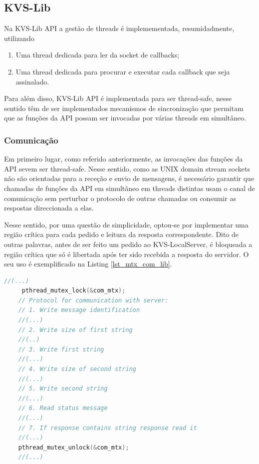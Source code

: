 \subsection{KVS-Lib}
Na KVS-Lib API a gestão de threads é implemementada, resumidadmente, utilizando
\begin{enumerate}[noitemsep]
    \item Uma thread dedicada para ler da socket de callbacks;
    \item Uma thread dedicada para procurar e executar cada callback que seja assinalado.
\end{enumerate}
Para além disso, KVS-Lib API é implementada para ser thread-safe, nesse sentido têm de ser implementados mecanismos de sincronização que permitam que as funções da API possam ser invocadas por várias threads em simultâneo.

\subsubsection{Comunicação}
Em primeiro lugar, como referido anteriormente, as invocações das funções da API sevem ser thread-safe. Nesse sentido, como as UNIX domain stream sockets não são orientadas para a receção e envio de mensagens, é necessário garantir que chamadas de funções da API em simultâneo em threads distintas usam o canal de comunicação sem perturbar o protocolo de outras chamadas ou consumir as respostas direccionada a elas.

Nesse sentido, por uma questão de simplicidade, optou-se por implementar uma região crítica para cada pedido e leitura da resposta correspondente. Dito de outras palavras, antes de ser feito um pedido ao KVS-LocalServer, é bloqueada a região crítica que só é libertada após ter sido recebida a resposta do servidor. O seu uso é exemplificado na Listing \ref{lst_mtx_com_lib}.
\begin{lstlisting}[language=C,label={lst_mtx_com_lib},caption= Uso de uma região crítica para a integridade de comunicação entre KVS-Lib e KVS-LocalServer (\texttt{KVS-lib-com.c}).]
    //(...)
     pthread_mutex_lock(&com_mtx);
    // Protocol for communication with server:
    // 1. Write message identification
    //(...)
    // 2. Write size of first string
    //(..)
    // 3. Write first string
    //(...)
    // 4. Write size of second string
    //(...)
    // 5. Write second string
    //(...)
    // 6. Read status message
    //(...)
    // 7. If response contains string response read it
    //(...)
    pthread_mutex_unlock(&com_mtx);
    //(...)
\end{lstlisting}

